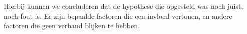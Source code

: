 \documentclass{hogent-article}
\begin{document}
Hierbij kunnen we concluderen dat de hypothese die opgesteld was noch juist, noch fout is. Er zijn bepaalde factoren die een invloed vertonen, en andere factoren die geen verband blijken te hebben.


\printbibliography[heading=bibintoc]
\end{document}
